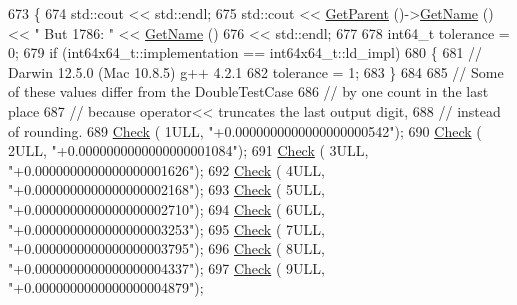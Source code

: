\begin{DoxyCode}
673 \{
674   std::cout << std::endl;
675   std::cout << \hyperlink{classns3_1_1TestCase_af41db0462b844c9f81838d0e61ecd563}{GetParent} ()->\hyperlink{classns3_1_1TestCase_a28f7bb59669c24dae1c290fc17fc9b62}{GetName} () << \textcolor{stringliteral}{" But 1786: "} << 
      \hyperlink{classns3_1_1TestCase_a28f7bb59669c24dae1c290fc17fc9b62}{GetName} ()
676             << std::endl;
677 
678   int64\_t tolerance = 0;
679   \textcolor{keywordflow}{if} (int64x64\_t::implementation == int64x64\_t::ld\_impl)
680     \{
681       \textcolor{comment}{// Darwin 12.5.0 (Mac 10.8.5) g++ 4.2.1}
682       tolerance = 1;
683     \}
684 
685   \textcolor{comment}{// Some of these values differ from the DoubleTestCase}
686   \textcolor{comment}{// by one count in the last place}
687   \textcolor{comment}{// because operator<< truncates the last output digit,}
688   \textcolor{comment}{// instead of rounding.}
689   \hyperlink{classns3_1_1int64x64_1_1test_1_1Int64x64Bug1786TestCase_aa4b4b833335ea1266a4f7f5f0e314b5b}{Check} (                 1ULL, \textcolor{stringliteral}{"+0.0000000000000000000542"});
690   \hyperlink{classns3_1_1int64x64_1_1test_1_1Int64x64Bug1786TestCase_aa4b4b833335ea1266a4f7f5f0e314b5b}{Check} (                 2ULL, \textcolor{stringliteral}{"+0.0000000000000000001084"});
691   \hyperlink{classns3_1_1int64x64_1_1test_1_1Int64x64Bug1786TestCase_aa4b4b833335ea1266a4f7f5f0e314b5b}{Check} (                 3ULL, \textcolor{stringliteral}{"+0.0000000000000000001626"});
692   \hyperlink{classns3_1_1int64x64_1_1test_1_1Int64x64Bug1786TestCase_aa4b4b833335ea1266a4f7f5f0e314b5b}{Check} (                 4ULL, \textcolor{stringliteral}{"+0.0000000000000000002168"});
693   \hyperlink{classns3_1_1int64x64_1_1test_1_1Int64x64Bug1786TestCase_aa4b4b833335ea1266a4f7f5f0e314b5b}{Check} (                 5ULL, \textcolor{stringliteral}{"+0.0000000000000000002710"});
694   \hyperlink{classns3_1_1int64x64_1_1test_1_1Int64x64Bug1786TestCase_aa4b4b833335ea1266a4f7f5f0e314b5b}{Check} (                 6ULL, \textcolor{stringliteral}{"+0.0000000000000000003253"});
695   \hyperlink{classns3_1_1int64x64_1_1test_1_1Int64x64Bug1786TestCase_aa4b4b833335ea1266a4f7f5f0e314b5b}{Check} (                 7ULL, \textcolor{stringliteral}{"+0.0000000000000000003795"});
696   \hyperlink{classns3_1_1int64x64_1_1test_1_1Int64x64Bug1786TestCase_aa4b4b833335ea1266a4f7f5f0e314b5b}{Check} (                 8ULL, \textcolor{stringliteral}{"+0.0000000000000000004337"});
697   \hyperlink{classns3_1_1int64x64_1_1test_1_1Int64x64Bug1786TestCase_aa4b4b833335ea1266a4f7f5f0e314b5b}{Check} (                 9ULL, \textcolor{stringliteral}{"+0.0000000000000000004879"});

\end{DoxyCode}
